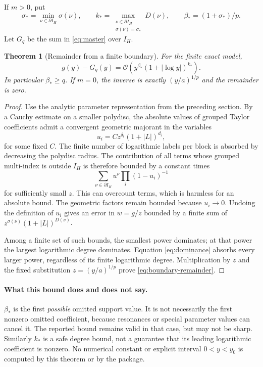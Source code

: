 \documentclass[11pt,a4paper]{article}
\numberwithin{equation}{section}
\newtheorem{theorem}{Theorem}[section]
\theoremstyle{definition}
\theoremstyle{remark}
\newcommand{\OO}{\mathcal O}
\begin{document}
If $m>0$, put
\begin{equation}
 \sigma_* =\min_{\nu\in\partial I_H}\sigma(\nu),\qquad
 k_* =\max_{\substack{\nu\in\partial I_H\\\sigma(\nu)=\sigma_*}}D(\nu),
 \qquad \beta_*=(1+\sigma_*)/p.
 \label{eq:boundary-data}
\end{equation}
Let $G_q$ be the sum in \eqref{eq:master} over $I_H$.

\begin{theorem}[Remainder from a finite boundary]
For the finite exact model,
\begin{equation}
 g(y)-G_q(y)=\OO\left(y^{\beta_*}(1+|\log y|)^{k_*}\right).
 \label{eq:boundary-remainder}
\end{equation}
In particular $\beta_*\ge q$. If $m=0$, the inverse is exactly $(y/a)^{1/p}$
and the remainder is zero.
\end{theorem}
\begin{proof}
Use the analytic parameter representation from the preceding section.
By a Cauchy estimate on a smaller polydisc, the absolute values of grouped
Taylor coefficients admit a convergent geometric majorant in the variables
\[
 u_i=Cz^{\delta_i}(1+|L|)^{d_i},
\]
for some fixed $C$. The finite number of logarithmic labels per block is
absorbed by decreasing the polydisc radius. The contribution of all terms
whose grouped multi-index is outside $I_H$ is therefore bounded by a
constant times
\[
 \sum_{\nu\in\partial I_H}u^\nu
       \prod_i(1-u_i)^{-1}
\]
for sufficiently small $z$. This can overcount terms, which is harmless for
an absolute bound. The geometric factors remain bounded because $u_i\to0$.
Undoing the definition of $u_i$ gives an error in $w=g/z$ bounded by a finite
sum of $z^{\sigma(\nu)}(1+|L|)^{D(\nu)}$.

Among a finite set of such bounds, the smallest power dominates; at that
power the largest logarithmic degree dominates. Equation
\eqref{eq:dominance} absorbs every larger power, regardless of its finite
logarithmic degree. Multiplication by $z$ and the fixed substitution
$z=(y/a)^{1/p}$ prove \eqref{eq:boundary-remainder}.
\end{proof}

\paragraph{What this bound does and does not say.}
$\beta_*$ is the first \emph{possible} omitted support value. It is not
necessarily the first nonzero omitted coefficient, because resonances or
special parameter values can cancel it. The reported bound remains valid
in that case, but may not be sharp. Similarly $k_*$ is a safe degree bound,
not a guarantee that its leading logarithmic coefficient is nonzero.
No numerical constant or explicit interval $0<y<y_0$ is computed by this
theorem or by the package.
\end{document}
